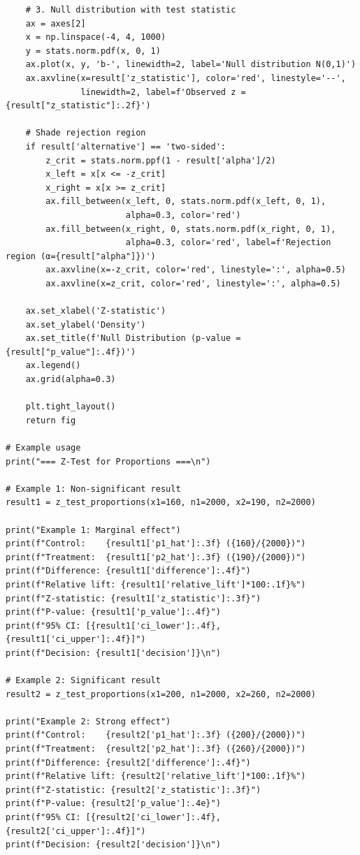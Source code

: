 \begin{lstlisting}
    # 3. Null distribution with test statistic
    ax = axes[2]
    x = np.linspace(-4, 4, 1000)
    y = stats.norm.pdf(x, 0, 1)
    ax.plot(x, y, 'b-', linewidth=2, label='Null distribution N(0,1)')
    ax.axvline(x=result['z_statistic'], color='red', linestyle='--',
               linewidth=2, label=f'Observed z = {result["z_statistic"]:.2f}')

    # Shade rejection region
    if result['alternative'] == 'two-sided':
        z_crit = stats.norm.ppf(1 - result['alpha']/2)
        x_left = x[x <= -z_crit]
        x_right = x[x >= z_crit]
        ax.fill_between(x_left, 0, stats.norm.pdf(x_left, 0, 1),
                        alpha=0.3, color='red')
        ax.fill_between(x_right, 0, stats.norm.pdf(x_right, 0, 1),
                        alpha=0.3, color='red', label=f'Rejection region (α={result["alpha"]})')
        ax.axvline(x=-z_crit, color='red', linestyle=':', alpha=0.5)
        ax.axvline(x=z_crit, color='red', linestyle=':', alpha=0.5)

    ax.set_xlabel('Z-statistic')
    ax.set_ylabel('Density')
    ax.set_title(f'Null Distribution (p-value = {result["p_value"]:.4f})')
    ax.legend()
    ax.grid(alpha=0.3)

    plt.tight_layout()
    return fig

# Example usage
print("=== Z-Test for Proportions ===\n")

# Example 1: Non-significant result
result1 = z_test_proportions(x1=160, n1=2000, x2=190, n2=2000)

print("Example 1: Marginal effect")
print(f"Control:    {result1['p1_hat']:.3f} ({160}/{2000})")
print(f"Treatment:  {result1['p2_hat']:.3f} ({190}/{2000})")
print(f"Difference: {result1['difference']:.4f}")
print(f"Relative lift: {result1['relative_lift']*100:.1f}%")
print(f"Z-statistic: {result1['z_statistic']:.3f}")
print(f"P-value: {result1['p_value']:.4f}")
print(f"95% CI: [{result1['ci_lower']:.4f}, {result1['ci_upper']:.4f}]")
print(f"Decision: {result1['decision']}\n")

# Example 2: Significant result
result2 = z_test_proportions(x1=200, n1=2000, x2=260, n2=2000)

print("Example 2: Strong effect")
print(f"Control:    {result2['p1_hat']:.3f} ({200}/{2000})")
print(f"Treatment:  {result2['p2_hat']:.3f} ({260}/{2000})")
print(f"Difference: {result2['difference']:.4f}")
print(f"Relative lift: {result2['relative_lift']*100:.1f}%")
print(f"Z-statistic: {result2['z_statistic']:.3f}")
print(f"P-value: {result2['p_value']:.4e}")
print(f"95% CI: [{result2['ci_lower']:.4f}, {result2['ci_upper']:.4f}]")
print(f"Decision: {result2['decision']}\n")


\end{lstlisting}
